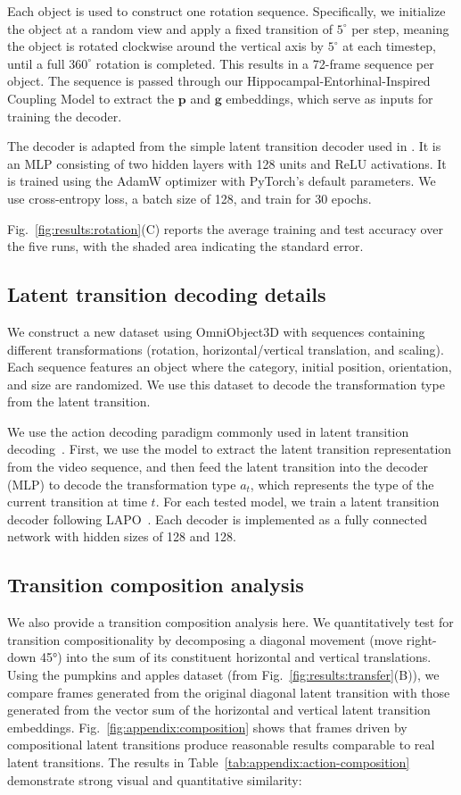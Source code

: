 Each object is used to construct one rotation sequence. Specifically, we initialize the object at a random view and apply a fixed transition of $5^\circ$ per step, meaning the object is rotated clockwise around the vertical axis by $5^\circ$ at each timestep, until a full $360^\circ$ rotation is completed. This results in a 72-frame sequence per object. The sequence is passed through our Hippocampal-Entorhinal-Inspired Coupling Model to extract the $\mathbf{p}$ and $\mathbf{g}$ embeddings, which serve as inputs for training the decoder.

The decoder is adapted from the simple latent transition decoder used in \cite{yeLatentActionPretraining2024}. It is an MLP consisting of two hidden layers with 128 units and ReLU activations. It is trained using the AdamW optimizer with PyTorch's default parameters. We use cross-entropy loss, a batch size of 128, and train for 30 epochs.

Fig.~\ref{fig:results:rotation}(C) reports the average training and test accuracy over the five runs, with the shaded area indicating the standard error.


\subsection{Latent transition decoding details}
We construct a new dataset using OmniObject3D with sequences containing different transformations (rotation, horizontal/vertical translation, and scaling). Each sequence features an object where the category, initial position, orientation, and size are randomized. We use this dataset to decode the transformation type from the latent transition.

We use the action decoding paradigm commonly used in latent transition decoding~\citep{lapo}. First, we use the model to extract the latent transition representation from the video sequence, and then feed the latent transition into the decoder (MLP) to decode the transformation type $a_t$, which represents the type of the current transition at time $t$. For each tested model, we train a latent transition decoder following LAPO~\citep{lapo}. Each decoder is implemented as a fully connected network with hidden sizes of 128 and 128. 

\subsection{Transition composition analysis}
We also provide a transition composition analysis here. We quantitatively test for transition compositionality by decomposing a diagonal movement (move right-down 45°) into the sum of its constituent horizontal and vertical translations. Using the pumpkins and apples dataset (from Fig.~\ref{fig:results:transfer}(B)), we compare frames generated from the original diagonal latent transition with those generated from the vector sum of the horizontal and vertical latent transition embeddings. Fig.~\ref{fig:appendix:composition} shows that frames driven by compositional latent transitions produce reasonable results comparable to real latent transitions. The results in Table~\ref{tab:appendix:action-composition} demonstrate strong visual and quantitative similarity:

